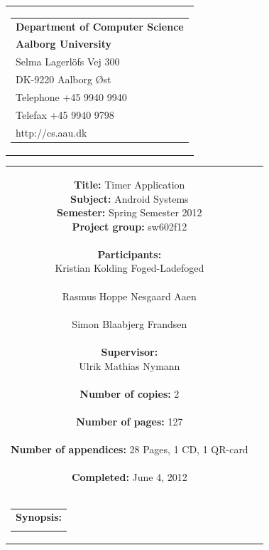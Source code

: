 \begin{nopagebreak}
\samepage 
\begin{tabular}{r}
\parbox{\textwidth}{
\hfill \parbox{6.2cm}{\begin{tabular}{l}
{\textsf\small \textbf{Department of Computer Science }}\\
{\textsf\small  \textbf{Aalborg University}}\\
{\textsf\small Selma Lagerlöfs Vej 300}\\
{\textsf\small DK-9220 Aalborg Øst}\\
{\textsf\small Telephone +45 9940 9940}\\
{\textsf\small Telefax +45 9940 9798}\\
{\textsf\small http://cs.aau.dk}
\end{tabular}}}
\end{tabular}

\begin{tabular}{cc}
\parbox{7cm}{
\textbf{Title:} 
Timer Application\\
\textbf{Subject:} 
Android Systems\\
\textbf{Semester:} Spring Semester 2012\\
\textbf{Project group:} sw602f12\\ \\
\textbf{Participants:} \\
Kristian Kolding Foged-Ladefoged \\ \\
Rasmus Hoppe Nesgaard Aaen \\ \\
Simon Blaabjerg Frandsen \\ \\
\textbf{Supervisor:} \\
Ulrik Mathias Nymann\\ \\
\textbf{Number of copies:}
2 \\ \\
\textbf{Number of pages:}
127 \\ \\
\textbf{Number of appendices:}
28 Pages, 1 CD, 1 QR-card\\ \\
\textbf{Completed:}
June 4, 2012 \\ \\
}

\parbox{7cm}{
\vspace{.15cm}
\hfill 
\begin{tabular}{l}
\textbf{Synopsis:} \\
\fbox{
\parbox{6.5cm}{
{\vfill{\small {}\bigskip}}
}}
\end{tabular}}
\end{tabular}


\end{nopagebreak}